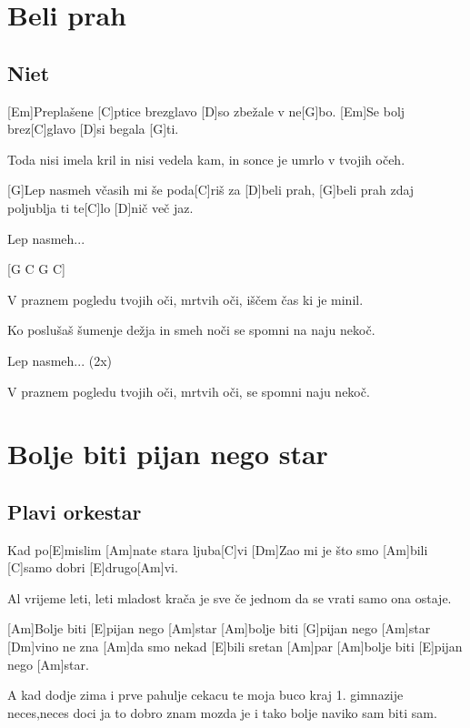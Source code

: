 \documentclass[a4paper,12pt]{article}
\begin{document}
\begin{multicols}{2}
\begin{guitar}
\end{guitar}
\section{Beli prah}
\subsection*{Niet}
\begin{guitar}
[G C G C]

[Em]Preplašene [C]ptice brezglavo [D]so 
zbežale v ne[G]bo.
[Em]Se bolj brez[C]glavo 
[D]si begala [G]ti.


Toda nisi imela kril
in nisi vedela kam,
in sonce je umrlo
v tvojih očeh.


[G]Lep nasmeh včasih mi še poda[C]riš
za [D]beli prah,
[G]beli prah zdaj poljublja ti te[C]lo
[D]nič več jaz.


Lep nasmeh...


[G C G C]

V praznem pogledu tvojih oči, 
mrtvih oči,
iščem čas ki je minil.


Ko poslušaš šumenje dežja
in smeh noči
se spomni na naju nekoč.


Lep nasmeh... (2x)


V praznem pogledu tvojih oči,
mrtvih oči,
se spomni naju nekoč.

\end{guitar}
\section{Bolje biti pijan nego star}
\subsection*{Plavi orkestar}
\begin{guitar}
[Am]Kad po[E]mislim [Am]nate
stara ljuba[C]vi
[Dm]Zao mi je što smo [Am]bili
[C]samo dobri [E]drugo[Am]vi.


Al vrijeme leti, leti
mladost krača je
sve če jednom da se vrati
samo ona ostaje.


[Am]Bolje biti [E]pijan nego [Am]star
[Am]bolje biti [G]pijan nego [Am]star
[Dm]vino ne zna [Am]da smo nekad 
[E]bili sretan [Am]par
[Am]bolje biti [E]pijan nego [Am]star.


A kad dodje zima i prve pahulje
cekacu te moja buco kraj 1. gimnazije
neces,neces doci ja to dobro znam
mozda je i tako bolje
naviko sam biti sam.

\end{guitar}

\end{multicols}
\end{document}
